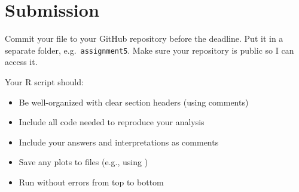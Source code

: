 \vspace{15pt}

\section{Submission}

Commit your file to your GitHub repository before the deadline. Put it in a separate folder, e.g.\ \texttt{assignment5}. Make sure your repository is public so I can access it.

Your R script should:
\begin{itemize}
  \item Be well-organized with clear section headers (using comments)
  \item Include all code needed to reproduce your analysis
  \item Include your answers and interpretations as comments
  \item Save any plots to files (e.g., using )
  \item Run without errors from top to bottom
\end{itemize}


